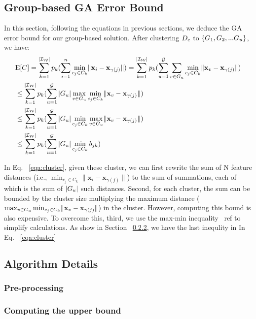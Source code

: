 




\subsection{Group-based GA Error Bound}

In this section, following the equations in previous sections, we deduce the GA error bound for our group-based solution. After clustering $D_c$ to $\{ G_1 , G_2, ...G_u\}$, we have:
\vspace{-0.5em}
\begin{equation}\label{eqa:cluster}
    \begin{aligned}
	& \mathrm{E}[C] = \sum_{k= 1}^{|\mathcal{I_W}|} p_k (\sum_{i=1}^n \min_{c_j\in C_k}\lVert\mathbf{x}_i - \mathbf{x}_{\gamma(j)}\rVert) =  \sum_{k= 1}^{|\mathcal{I_W}|} p_k (\sum_{u=1}^{\mathcal{G}}\sum_{v \in G_u} \min_{c_j\in C_k}\lVert\mathbf{x}_v - \mathbf{x}_{\gamma(j)}\rVert) \\
    & \leq \sum_{k= 1}^{|\mathcal{I_W}|} p_k (\sum_{u=1}^{\mathcal{G}} |G_u| \max_{v \in G_u} \min_{c_j\in C_k}\lVert\mathbf{x}_v - \mathbf{x}_{\gamma(j)}\rVert) \\
    &  \leq \sum_{k= 1}^{|\mathcal{I_W}|} p_k (\sum_{u=1}^{\mathcal{G}} |G_u| \min_{c_j\in C_k} \max_{v \in G_u} \lVert\mathbf{x}_v - \mathbf{x}_{\gamma(j)}\rVert) \\
    & \leq \sum_{k= 1}^{|\mathcal{I_W}|} p_k (\sum_{u=1}^{\mathcal{G}} |G_u| \min_{c_j\in C_k} b_{jk})
    \end{aligned}
\end{equation}

In Eq. ~\ref{eqa:cluster}, given these cluster, we can first rewrite the sum of N feature distances (i.e., $\min_{c_j\in C_k}\lVert\mathbf{x}_i - \mathbf{x}_{\gamma(j)}\rVert$) to the sum of \groups summations, each of which is the sum of $|G_u|$ such distances. Second, for each cluster, the sum can be bounded by the cluster size multiplying the maximum distance ($\max_{v \in G_u} \min_{c_j\in C_k}\lVert\mathbf{x}_v - \mathbf{x}_{\gamma(j)}\rVert$) in the cluster. However, computing this bound is also expensive. To overcome this, third, we use the max-min inequality ~ref{} to simplify calculations. As show in Section ~\ref{}, we have the last inequlity in In Eq. ~\ref{eqa:cluster}


\subsection{Algorithm Details}


\subsubsection{Pre-processing}


\subsubsection{Computing the upper bound}



